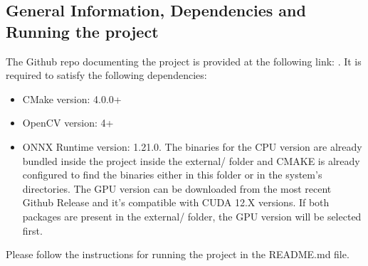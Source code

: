 \subsection{General Information, Dependencies and Running the project}
The Github repo documenting the project is provided at the following link: \cite{github_repo}. It is required to satisfy the following dependencies:
\begin{itemize}
    \item CMake version: 4.0.0+
    \item OpenCV version: 4+
    \item ONNX Runtime version: 1.21.0. The binaries for the CPU version are already bundled inside the project inside the external/ folder and CMAKE is already configured to find the binaries either in this folder or in the system's directories. The GPU version can be downloaded from the most recent Github Release and it's compatible with CUDA 12.X versions. If both packages are present in the external/ folder, the GPU version will be selected first.
\end{itemize}
Please follow the instructions for running the project in the README.md file.